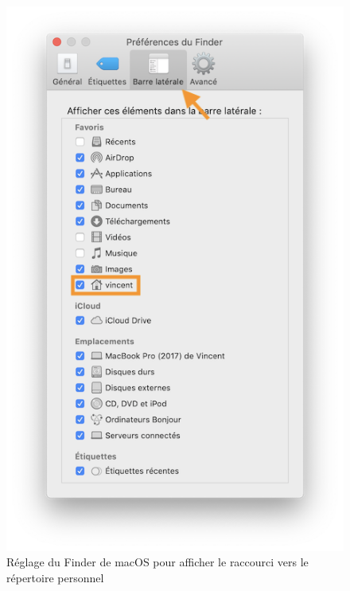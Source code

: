 \begin{exercice}[nosol]
  \begin{figure}
    \centering
    \includegraphics{images/finder-preferences}
    \caption{Réglage du Finder de macOS pour afficher le raccourci
      vers le répertoire personnel}
    \label{fig:informatique:finder-preferences}
  \end{figure}
\end{exercice}


